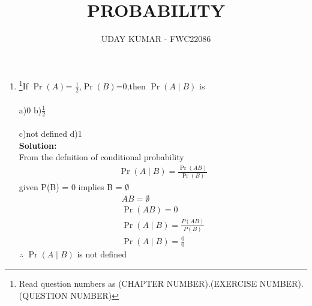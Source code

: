 \documentclass{article}
\providecommand{\pr}[1]{\ensuremath{\Pr\left(#1\right)}}
\newcommand{\solution}{\noindent \textbf{Solution: }}
\begin{document}
\title{PROBABILITY}
\author{\Large UDAY KUMAR - FWC22086}
\date{}

\maketitle

\begin{enumerate}[label=13.\arabic{enumi}.\arabic{enumii}]%
\setcounter{enumi}{0}
\setcounter{enumii}{6}

\item \footnote{Read question numbers as (CHAPTER NUMBER).(EXERCISE NUMBER).(QUESTION NUMBER)}{If \pr{A}= $\frac{1}{2}$,\pr{B}=0,then \pr{A \mid B} is }
\hspace{15mm}\\
\\
a)0 \hspace{50mm} b)$\frac{1}{2}$
\\
\\
c)not defined \hspace{36mm} d)1\\[1ex]
	\solution\\
		From the defnition of conditional probability\\
\begin{align}
\pr{A \mid B} = \frac{\pr{A B}}{\pr{B}}
\end{align}
given P(B) = 0 implies  B = $\emptyset$ 
\begin{align}
AB = \emptyset\\
\pr{A B} =0\\
\pr{A \mid B} = \frac{P(AB)}{P(B)}\\
\pr{A \mid B} = \frac{0}{0}
\end{align}
$\therefore$ \pr{A \mid B} is not defined
\end{enumerate}
\end{document}
